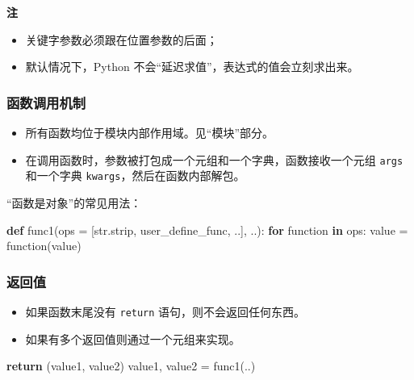 \documentclass[utf-8]{ctexart}
\newenvironment{Shaded}{}{}
\newcommand{\KeywordTok}[1]{\textcolor[rgb]{0.00,0.44,0.13}{\textbf{#1}}}
\newcommand{\ControlFlowTok}[1]{\textcolor[rgb]{0.00,0.44,0.13}{\textbf{#1}}}
\newcommand{\OperatorTok}[1]{\textcolor[rgb]{0.40,0.40,0.40}{#1}}
\newcommand{\BuiltInTok}[1]{#1}
\newcommand{\NormalTok}[1]{#1}
\begin{document}
\textbf{注}

\begin{itemize}
\item
  关键字参数必须跟在位置参数的后面；
\item
  默认情况下，Python 不会``延迟求值''，表达式的值会立刻求出来。
\end{itemize}

\subsubsection{函数调用机制}\label{header-n234}

\begin{itemize}
\item
  所有函数均位于模块内部作用域。见``模块''部分。
\item
  在调用函数时，参数被打包成一个元组和一个字典，函数接收一个元组
  \texttt{args} 和一个字典 \texttt{kwargs}，然后在函数内部解包。
\end{itemize}

``函数是对象''的常见用法：

\begin{Shaded}
\begin{Highlighting}[]
\KeywordTok{def}\NormalTok{ func1(ops }\OperatorTok{=}\NormalTok{ [}\BuiltInTok{str}\NormalTok{.strip, user_define_func, ..], ..):}
  \ControlFlowTok{for}\NormalTok{ function }\KeywordTok{in}\NormalTok{ ops:}
\NormalTok{    value }\OperatorTok{=}\NormalTok{ function(value)}
\end{Highlighting}
\end{Shaded}

\subsubsection{返回值}\label{header-n245}

\begin{itemize}
\item
  如果函数末尾没有 \texttt{return} 语句，则不会返回任何东西。
\item
  如果有多个返回值则通过一个元组来实现。
\end{itemize}

\begin{Shaded}
\begin{Highlighting}[]
\ControlFlowTok{return}\NormalTok{ (value1, value2)}
\NormalTok{value1, value2 }\OperatorTok{=}\NormalTok{ func1(..)}
\end{Highlighting}
\end{Shaded}
\end{document}
